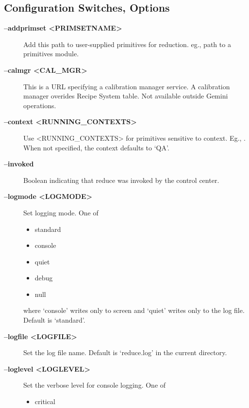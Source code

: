 \documentclass[letterpaper,10pt,english]{sphinxmanual}
\begin{document}
\subsection{Configuration Switches, Options}
\label{interfaces:configuration-switches-options}\label{interfaces:options}\begin{description}
\item[{\textbf{--addprimset \textless{}PRIMSETNAME\textgreater{}}}] \leavevmode
Add this path to user-supplied primitives for reduction. eg., path to a
primitives module.

\item[{\textbf{--calmgr \textless{}CAL\_MGR\textgreater{}}}] \leavevmode
This is a URL specifying a calibration manager service. A calibration manager
overides Recipe System table. Not available outside Gemini operations.

\item[{\textbf{--context \textless{}RUNNING\_CONTEXTS\textgreater{}}}] \leavevmode
Use \textless{}RUNNING\_CONTEXTS\textgreater{} for primitives sensitive to context. Eg.,
. When not specified, the context defaults to `QA'.

\item[{\textbf{--invoked}}] \leavevmode
Boolean indicating that reduce was invoked by the control center.

\item[{\textbf{--logmode \textless{}LOGMODE\textgreater{}}}] \leavevmode
Set logging mode. One of
\begin{itemize}
\item {} 
standard

\item {} 
console

\item {} 
quiet

\item {} 
debug

\item {} 
null

\end{itemize}

where `console' writes only to screen and `quiet' writes only to the log
file. Default is `standard'.

\item[{\textbf{--logfile \textless{}LOGFILE\textgreater{}}}] \leavevmode
Set the log file name. Default is `reduce.log' in the current directory.

\item[{\textbf{--loglevel \textless{}LOGLEVEL\textgreater{}}}] \leavevmode
Set the verbose level for console logging. One of
\begin{itemize}
\item {} 
critical


\end{itemize}
\end{description}
\end{document}
